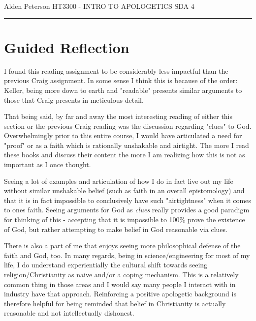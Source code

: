 \documentclass[12pt]{turabian-researchpaper}
\begin{document}
\begin{singlespace}
\noindent Alden Peterson \newline
\noindent HT3300 - INTRO TO APOLOGETICS \newline
\noindent SDA 4 \newline
\noindent\rule{4cm}{0.4pt}
\end{singlespace}

\section{Guided Reflection}

I found this reading assignment to be considerably less impactful than the previous Craig assignment. In some sense I think this is because of the order: Keller, being more down to earth and "readable" presents similar arguments to those that Craig presents in meticulous detail.

That being said, by far and away the most interesting reading of either this section or the previous Craig reading was the discussion regarding "clues" to God. Overwhelmingly prior to this entire course, I would have articulated a need for "proof" or as a faith which is rationally unshakable and airtight. The more I read these books and discuss their content the more I am realizing how this is not as important as I once thought.

Seeing a lot of examples and articulation of how I do in fact live out my life without similar unshakable belief (such as faith in an overall epistomology) and that it is in fact impossible to conclusively have such "airtightness" when it comes to ones faith. Seeing arguments for God as \textit{clues} really provides a good paradigm for thinking of this - accepting that it is impossible to 100\% prove the existence of God, but rather attempting to make belief in God reasonable via clues.

There is also a part of me that enjoys seeing more philosophical defense of the faith and God, too. In many regards, being in science/engineering for most of my life, I do understand experientially the cultural shift towards seeing religion/Christianity as naive and/or a coping mechanism. This is a relatively common thing in those areas and I would say many people I interact with in industry have that approach. Reinforcing a positive apologetic background is therefore helpful for being reminded that belief in Christianity is actually reasonable and not intellectually dishonest. 
\end{document}
